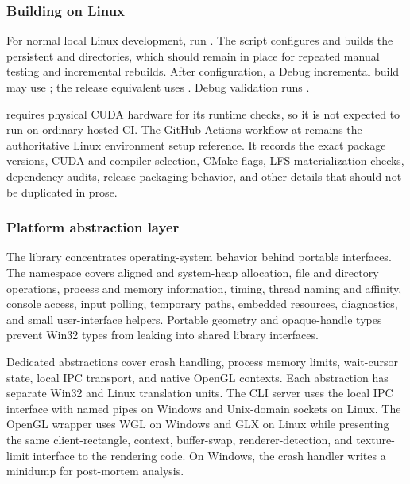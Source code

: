 \subsubsection{Building on Linux}
\label{subsec:building-linux}

For normal local Linux development, run . The script
configures and builds the persistent  and
 directories, which should remain in place for repeated
manual testing and incremental rebuilds. After configuration, a Debug
incremental build may use ;
the release equivalent uses . Debug validation runs
.

 requires physical CUDA hardware for its runtime
checks, so it is not expected to run on ordinary hosted CI. The GitHub Actions
workflow at  remains the authoritative Linux
environment setup reference. It records the exact package versions, CUDA and
compiler selection, CMake flags, LFS materialization checks, dependency audits,
release packaging behavior, and other details that should not be duplicated in
prose.

\subsubsection{Platform abstraction layer}
\label{subsec:platform-abstraction}

The  library concentrates operating-system behavior
behind portable interfaces. The  namespace covers aligned
and system-heap allocation, file and directory operations, process and memory
information, timing, thread naming and affinity, console access, input polling,
temporary paths, embedded resources, diagnostics, and small user-interface
helpers. Portable geometry and opaque-handle types prevent Win32 types from
leaking into shared library interfaces.

Dedicated abstractions cover crash handling, process memory limits, wait-cursor
state, local IPC transport, and native OpenGL contexts. Each abstraction has
separate Win32 and Linux translation units. The CLI server uses the local IPC
interface with named pipes on Windows and Unix-domain sockets on Linux. The
OpenGL wrapper uses WGL on Windows and GLX on Linux while presenting the same
client-rectangle, context, buffer-swap, renderer-detection, and texture-limit
interface to the rendering code. On Windows, the crash handler writes a
 minidump for post-mortem analysis.

